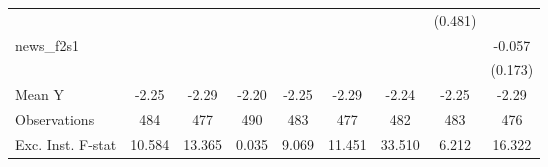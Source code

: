 {\begin{tabular}{l*{8}{c}}
            &                     &                     &                     &                     &                     &                     &     (0.481)         &                     \\
\addlinespace
news\_f2s1   &                     &                     &                     &                     &                     &                     &                     &      -0.057         \\
            &                     &                     &                     &                     &                     &                     &                     &     (0.173)         \\
\midrule
Mean Y      &       -2.25         &       -2.29         &       -2.20         &       -2.25         &       -2.29         &       -2.24         &       -2.25         &       -2.29         \\
Observations&         484         &         477         &         490         &         483         &         477         &         482         &         483         &         476         \\
Exc. Inst. F-stat&      10.584         &      13.365         &       0.035         &       9.069         &      11.451         &      33.510         &       6.212         &      16.322         \\
\bottomrule
\end{tabular}
}
